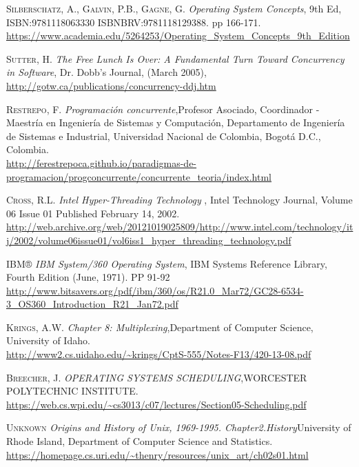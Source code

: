 \documentclass[12pt]{article}
\begin{document}
\begin{thebibliography}{x}
 \textsc{Silberschatz, A., Galvin, P.B., Gagne, G.}
\textit{Operating System Concepts}, 9th Ed, ISBN:9781118063330
ISBNBRV:9781118129388. pp 166-171.\\\url{https://www.academia.edu/5264253/Operating_System_Concepts_9th_Edition}

 \textsc{Sutter, H.}
\textit{The Free Lunch Is Over: A Fundamental Turn Toward Concurrency in Software}, Dr. Dobb's Journal, (March 2005), \\\url{http://gotw.ca/publications/concurrency-ddj.htm}

 \textsc{Restrepo, F.}
\textit{Programación concurrente},Profesor Asociado, Coordinador - Maestría en Ingeniería de Sistemas y Computación, Departamento de Ingeniería de Sistemas e Industrial, Universidad Nacional de Colombia, Bogotá D.C., Colombia. \\\url{http://ferestrepoca.github.io/paradigmas-de-programacion/progconcurrente/concurrente_teoria/index.html}

 \textsc{Cross, R.L.}
\textit{Intel Hyper-Threading Technology }, Intel Technology Journal, Volume 06 Issue 01 Published February 14, 2002. \\\url{http://web.archive.org/web/20121019025809/http://www.intel.com/technology/itj/2002/volume06issue01/vol6iss1_hyper_threading_technology.pdf}

 \textsc{IBM®}
\textit{IBM System/360 Operating System}, IBM Systems Reference Library, Fourth Edition (June, 1971). PP 91-92 \\\url{http://www.bitsavers.org/pdf/ibm/360/os/R21.0_Mar72/GC28-6534-3_OS360_Introduction_R21_Jan72.pdf}

 \textsc{Krings, A.W.}
\textit{Chapter 8: Multiplexing},Department of Computer Science, University of Idaho. \\\url{http://www2.cs.uidaho.edu/~krings/CptS-555/Notes-F13/420-13-08.pdf}

 \textsc{Breecher, J.}
\textit{OPERATING SYSTEMS
SCHEDULING},WORCESTER POLYTECHNIC INSTITUTE. \\\url{https://web.cs.wpi.edu/~cs3013/c07/lectures/Section05-Scheduling.pdf}

 \textsc{Unknown}
\textit{Origins and History of Unix, 1969-1995. Chapter2.History}University of Rhode Island, Department of Computer Science and Statistics.\\\url{https://homepage.cs.uri.edu/~thenry/resources/unix_art/ch02s01.html}
\end{thebibliography}
\end{document}
